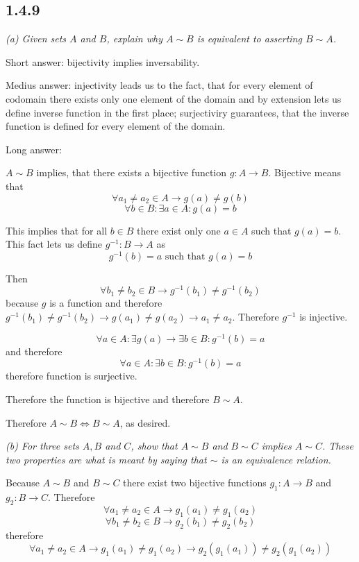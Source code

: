 \documentclass[11pt,oneside,titlepage]{book}
\begin{document}
\subsection*{1.4.9}
\textit{(a) Given sets $A$ and $B$, explain why $A \sim B$ is equivalent to asserting
  $B \sim A$.}

Short answer: bijectivity implies inversability.

Medius answer: injectivity leads us to the fact, that for every element of codomain there
exists only one element of the domain and by extension lets us
define inverse function in the first place;
surjectiviry guarantees, that the inverse function is defined for every element of the domain.

Long answer:

$A \sim B$ implies, that there exists a bijective function $g: A \to B$. Bijective means
that
$$\forall a_1 \neq a_2 \in A \to g(a) \neq g(b)$$
$$\forall b \in B: \exists a \in A: g(a) = b$$

This implies that for all $b \in B$ there exist only one $a \in A$ such that $g(a) = b$.
This fact lets us define $g^{-1}: B \to A$ as
$$g^{-1}(b) = a \text{ such that } g(a) = b$$

Then
$$\forall b_1 \neq b_2 \in B \to g^{-1}(b_1) \neq g^{-1}(b_2)$$
because $g$ is a function and therefore $g^{-1}(b_1) \neq g^{-1}(b_2) \to
g(a_1) \neq g(a_2) \to a_1 \neq a_2$. Therefore $g^{-1}$ is injective.

$$\forall a \in A: \exists g(a) \to \exists b \in B: g^{-1}(b) = a$$
and therefore
$$\forall a \in A: \exists b \in B: g^{-1}(b) = a$$
therefore function is surjective.

Therefore the function is bijective and therefore $B \sim A$.

Therefore $A \sim B \iff B \sim A $, as desired.


\textit{(b) For three sets $A, B$ and $C$, show that $A \sim B$ and $B \sim C$
  implies $A \sim C$. These two properties are what is meant by saying that $\sim$
  is an equivalence relation.}

Because $A \sim B$ and $B \sim C$ there exist two bijective functions $g_1: A \to B$ and
$g_2: B \to C$.
Therefore
$$\forall a_1 \neq a_2 \in A \to g_1(a_1) \neq g_1(a_2)$$
$$\forall b_1 \neq b_2 \in B \to g_2(b_1) \neq g_2(b_2)$$
therefore
$$\forall a_1 \neq a_2 \in A \to g_1(a_1) \neq g_1(a_2) \to g_2(g_1(a_1)) \neq g_2(g_1(a_2))$$
\end{document}
